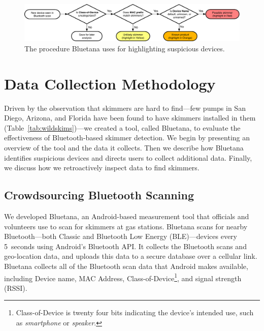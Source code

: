 
\begin{figure}
\centering
\includegraphics[width=\linewidth]{skimmer/fig/bluetana-flagging-flow}
\caption{
The procedure Bluetana uses for highlighting suspicious devices.
\label{fig:bluetana-flagging-flow}
}
\end{figure}

\section{Data Collection Methodology}
\label{sec:bluetana}

Driven by the observation that skimmers are hard to find---few pumps in San Diego, Arizona, and Florida have been found to have 
skimmers installed in them (Table~\ref{tab:wildskims})---we created a tool, called Bluetana, to evaluate the
effectiveness of Bluetooth-based skimmer detection.
%
We begin by presenting an overview of the tool and the data it collects.
%
Then we describe how Bluetana identifies suspicious devices and directs users
to collect additional data.
%
Finally, we discuss how we retroactively inspect data to find skimmers. 

\subsection{Crowdsourcing Bluetooth Scanning}
\label{sec:bluetana:tool}

We developed Bluetana, an Android-based measurement tool that officials and volunteers
use to scan for skimmers at gas stations.
%
%
Bluetana scans for nearby Bluetooth---both Classic and Bluetooth Low
Energy (BLE)---devices every 5~seconds using Android's Bluetooth API.
%
It collects the Bluetooth scans and geo-location data, and uploads this data to a
secure database over a cellular link.
%
Bluetana collects all of the Bluetooth scan data that Android makes available, including
Device name, MAC Address, Class-of-Device\footnote{Class-of-Device is twenty
  four bits indicating the device's intended use, such as \emph{smartphone} or
  \emph{speaker}.}, and signal strength (RSSI).


